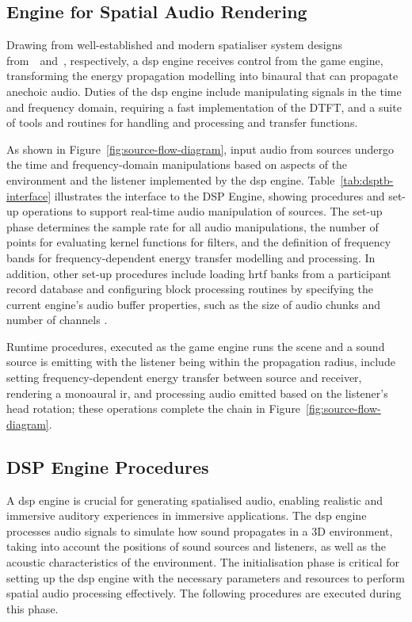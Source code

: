\subsection{Engine for Spatial Audio Rendering}

Drawing from well-established and modern spatialiser system designs from~\cite{naef2002spatialized}~and~\cite{lakka2021x3d}, respectively, a \acrshort{dsp} engine receives control from the game engine, transforming the energy propagation modelling into binaural  that can propagate anechoic audio. Duties of the \acrshort{dsp} engine include manipulating signals in the time and frequency domain, requiring a fast implementation of the DTFT, and a suite of tools and routines for handling and processing  and transfer functions.\par
As shown in Figure~\ref{fig:source-flow-diagram}, input audio from sources undergo the time and frequency-domain manipulations based on aspects of the environment and the listener implemented by the \acrshort{dsp} engine. Table~\ref{tab:dsptb-interface} illustrates the interface to the DSP Engine, showing procedures and set-up operations to support real-time audio manipulation of sources. The set-up phase determines the sample rate for all audio manipulations, the number of points for evaluating kernel functions for filters, and the definition of frequency bands for frequency-dependent energy transfer modelling and processing. In addition, other set-up procedures include loading \acrshort{hrtf} banks from a participant record database and configuring block processing routines by specifying the current engine's audio buffer properties, such as the size of audio chunks and number of channels \citep{hoene2017mysofa}.\par
Runtime procedures, executed as the game engine runs the scene and a sound source is emitting with the listener being within the propagation radius, include setting frequency-dependent energy transfer between source and receiver, rendering a monoaural \acrshort{ir}, and processing audio emitted based on the listener's head rotation; these operations complete the chain in Figure~\ref{fig:source-flow-diagram}.\par

\subsection{DSP Engine Procedures}
A \acrfull{dsp} engine is crucial for generating spatialised audio, enabling realistic and immersive auditory experiences in immersive applications. The \acrshort{dsp} engine processes audio signals to simulate how sound propagates in a 3D environment, taking into account the positions of sound sources and listeners, as well as the acoustic characteristics of the environment. The initialisation phase is critical for setting up the \acrshort{dsp} engine with the necessary parameters and resources to perform spatial audio processing effectively. The following procedures are executed during this phase.\par


